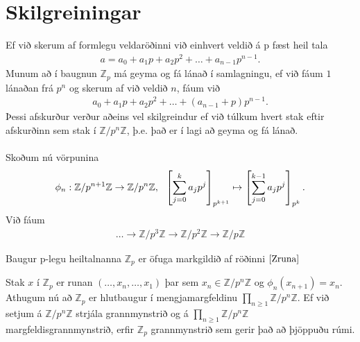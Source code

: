 \section*{Skilgreiningar}
Ef við skerum af formlegu veldaröðinni við einhvert veldið á p fæst heil tala 
\begin{align*}
a = a_0 + a_1 p + a_2 p^2 + \ldots + a_{n-1}p^{n-1}. 
\end{align*}
Munum að í baugnun $\mathbb{Z}_p$ má geyma og fá lánað í samlagningu, ef við 
fáum $1$ lánaðan frá $p^n$ og skerum af við veldið $n$, fáum við 
\begin{align*}
 a_0 + a_1 p + a_2 p^2 + \ldots + (a_{n-1} + p)p^{n-1}.
\end{align*}
Þessi afskurður verður aðeins vel skilgreindur ef við túlkum hvert 
stak eftir afskurðinn sem stak í $\mathbb{Z}/p^n \mathbb{Z}$, þ.e. það 
er í lagi að geyma og fá lánað.\\
\\Skoðum nú vörpunina
\begin{align*}
 \centering \phi_n : \mathbb{Z}/p^{n+1} \mathbb{Z} \rightarrow 
 \mathbb{Z}/p^{n} \mathbb{Z}, \ \  \left[\sum_{j=0}^k a_j p^j \right]
_{p^{k+1}} \mapsto \left[\sum_{j=0}^{k-1} a_j p^j \right]_{p^k}.
\end{align*}
Við fáum
\begin{align}\label{Zruna}
 \ldots \rightarrow \mathbb{Z}/p^{3} \mathbb{Z} \rightarrow \mathbb{Z}/p^{2} 
\mathbb{Z} \rightarrow \mathbb{Z}/p \mathbb{Z}
\end{align}
\begin{skilgr}
 Baugur p-legu heiltalnanna $\mathbb{Z}_p$ er öfuga markgildið af 
röðinni $\ref{Zruna}$
\end{skilgr}
Stak $x$ í $\mathbb{Z}_p$ er runan $(\ldots , x_n, \ldots, x_1)$ þar sem 
$x_n \in \mathbb{Z}/p^n\mathbb{Z}$ og $\phi_n(x_{n+1}) = x_{n}$.
Athugum nú að $\mathbb{Z}_p$ er hlutbaugur í mengjamargfeldinu
 $\prod_{n \geq 1} \mathbb{Z}/p^n\mathbb{Z}$. Ef við setjum á 
$\mathbb{Z}/p^n\mathbb{Z}$ strjála grannmynstrið og á 
$\prod_{n \geq 1} \mathbb{Z}/p^n\mathbb{Z}$ 
margfeldisgrannmynstrið, erfir $\mathbb{Z}_p$ grannmynstrið sem 
gerir það að þjöppuðu rúmi.\\
